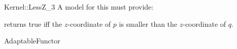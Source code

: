 \begin{ccRefFunctionObjectConcept}{Kernel::LessZ_3}
A model for this must provide:


{returns true iff the $z$-coordinate of $p$ is smaller than the
$z$-coordinate of $q$.}

\ccRefines
AdaptableFunctor

\ccSeeAlso
{}\\

\end{ccRefFunctionObjectConcept}
